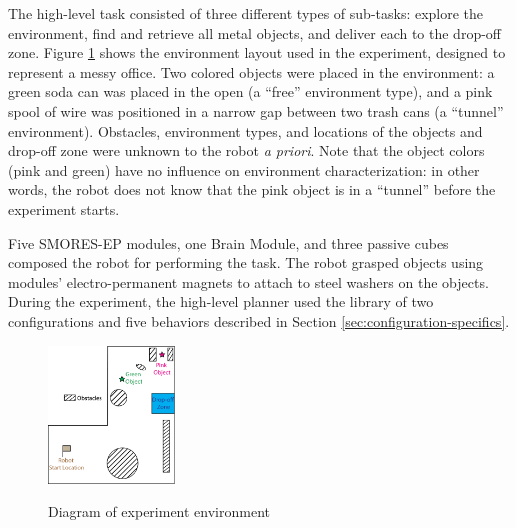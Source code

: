 \documentclass[conference]{IEEEtran}
\begin{document}
The high-level task consisted of three different types of sub-tasks: explore the environment, find and retrieve all metal objects, and deliver each to the drop-off zone. Figure \ref{fig:map} shows the environment layout used in the experiment, designed to represent a messy office. Two colored objects were placed in the environment: a green soda can was placed in the open (a ``free'' environment type), and a pink spool of wire was positioned in a narrow gap between two trash cans (a ``tunnel'' environment). Obstacles, environment types, and locations of the objects and drop-off zone were unknown to the robot \textit{a priori}.  Note that the object colors (pink and green) have no influence on environment characterization: in other words, the robot does not know that the pink object is in a ``tunnel''  before the experiment starts.

Five SMORES-EP modules, one Brain Module, and three passive cubes composed the robot for performing the task. The robot grasped objects using modules' electro-permanent magnets to attach to steel washers on the objects.
During the experiment, the high-level planner used the library of two configurations and five behaviors described in Section \ref{sec:configuration-specifics}.

\begin{figure}
\begin{center}
\includegraphics[width=0.3\textwidth]{images/RSSMap.png}
\caption{Diagram of experiment environment}
\vspace{-2em}
\label{fig:map}
\end{center}
\end{figure}
\end{document}
